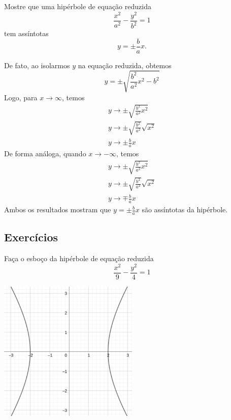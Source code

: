 \begin{exeresol}
  Mostre que uma hipérbole de equação reduzida
  \begin{equation}
    \frac{x^2}{a^2} - \frac{y^2}{b^2} = 1
  \end{equation}
  tem assíntotas
  \begin{equation}
    y = \pm \frac{b}{a}x.
  \end{equation}
\end{exeresol}
\begin{resol}
  De fato, ao isolarmos $y$ na equação reduzida, obtemos
  \begin{equation}
    y = \pm\sqrt{\frac{b^2}{a^2}x^2 - b^2}
  \end{equation}
  Logo, para $x\to \infty$, temos
  \begin{gather}
    y\to \pm\sqrt{\frac{b^2}{a^2}x^2} \\
    y\to \pm\sqrt{\frac{b^2}{a^2}}\sqrt{x^2}\\
    y\to \pm\frac{b}{a}x
  \end{gather}
  De forma análoga, quando $x\to -\infty$, temos
  \begin{gather}
    y\to \pm\sqrt{\frac{b^2}{a^2}x^2} \\
    y\to \pm\sqrt{\frac{b^2}{a^2}}\sqrt{x^2}\\
    y\to \mp\frac{b}{a}x
  \end{gather}
  Ambos os resultados mostram que $\displaystyle y=\pm\frac{b}{a}x$ são assíntotas da hipérbole.
\end{resol}

\subsection*{Exercícios}

\begin{exeresol}
  Faça o esboço da hipérbole de equação reduzida
  \begin{equation}
    \frac{x^2}{9} - \frac{y^2}{4} = 1
  \end{equation}
\end{exeresol}
\begin{resp}
  \includegraphics[width=0.5\textwidth]{cap_conicas/dados/fig_hiperbole_exer_ox/fig}
\end{resp}

